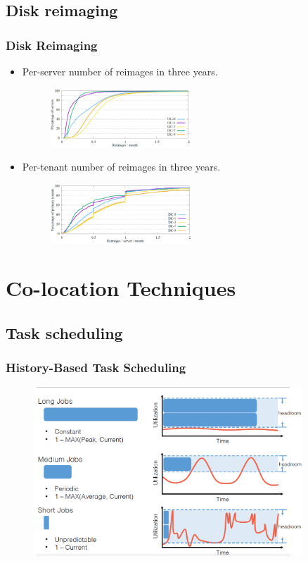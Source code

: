 \documentclass{beamer}
\begin{document}
\subsection{Disk reimaging}
	\begin{frame}
	\frametitle{Disk Reimaging}
		\begin{itemize}
		\item Per-server number of reimages in three years.
		\begin{figure}[h!]
		\centering
		\includegraphics[width=0.5\textwidth]{./figure/reimages1.PNG}
		\end{figure}
		\item Per-tenant number of reimages in three years.
		\begin{figure}[h!]
		\centering
		\includegraphics[width=0.5\textwidth]{./figure/reimages2.PNG}
		\end{figure}
		\end{itemize}
	\end{frame}

\section{Co-location Techniques}

\subsection{Task scheduling}
	\begin{frame}
	\frametitle{History-Based Task Scheduling}
		\begin{figure}[h!]
		\centering
		\includegraphics[width=0.9\textwidth]{./figure/task.PNG}
		\end{figure}
	\end{frame}
\end{document}
